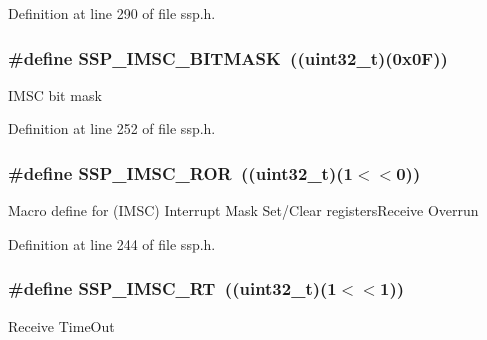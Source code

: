Definition at line 290 of file ssp.\+h.

\subsubsection[{\texorpdfstring{S\+S\+P\+\_\+\+I\+M\+S\+C\+\_\+\+B\+I\+T\+M\+A\+SK}{SSP_IMSC_BITMASK}}]{\setlength{\rightskip}{0pt plus 5cm}\#define S\+S\+P\+\_\+\+I\+M\+S\+C\+\_\+\+B\+I\+T\+M\+A\+SK~(({\bf uint32\+\_\+t})(0x0\+F))}\hypertarget{group___s_s_p___private___macros_gaaaf58d4122c6641ca6d1e6d18c5ef7be}{}\label{group___s_s_p___private___macros_gaaaf58d4122c6641ca6d1e6d18c5ef7be}
I\+M\+SC bit mask 

Definition at line 252 of file ssp.\+h.

\subsubsection[{\texorpdfstring{S\+S\+P\+\_\+\+I\+M\+S\+C\+\_\+\+R\+OR}{SSP_IMSC_ROR}}]{\setlength{\rightskip}{0pt plus 5cm}\#define S\+S\+P\+\_\+\+I\+M\+S\+C\+\_\+\+R\+OR~(({\bf uint32\+\_\+t})(1$<$$<$0))}\hypertarget{group___s_s_p___private___macros_gaa004d331d2d6bf2fc123de80d6e18a95}{}\label{group___s_s_p___private___macros_gaa004d331d2d6bf2fc123de80d6e18a95}
Macro define for (I\+M\+SC) Interrupt Mask Set/\+Clear registers\+Receive Overrun 

Definition at line 244 of file ssp.\+h.

\subsubsection[{\texorpdfstring{S\+S\+P\+\_\+\+I\+M\+S\+C\+\_\+\+RT}{SSP_IMSC_RT}}]{\setlength{\rightskip}{0pt plus 5cm}\#define S\+S\+P\+\_\+\+I\+M\+S\+C\+\_\+\+RT~(({\bf uint32\+\_\+t})(1$<$$<$1))}\hypertarget{group___s_s_p___private___macros_ga0396910287899ff6ab730425a8a332c7}{}\label{group___s_s_p___private___macros_ga0396910287899ff6ab730425a8a332c7}
Receive Time\+Out 

